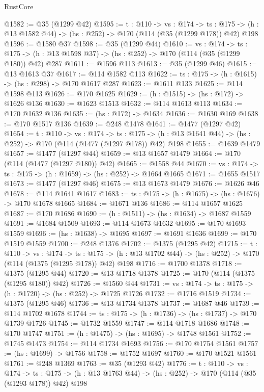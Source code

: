 \begin{lexlean}{RustCore}
\begin{coremodule}
@1582 := @35 (@1299 @42)
@1595 := {t : @110} ->
  {vs : @174} ->
  {ts : @175} -> (h : @13 @1582 @44) -> (hs : @252) -> @170 (@114 (@35 (@1299 @178)) @42) @198
@1596 := @1580 @37
@1598 := @35 (@1299 @44)
@1610 := {vs : @174} ->
  {ts : @175} -> (h : @13 @1598 @37) -> (hs : @252) -> @170 (@114 (@35 (@1299 @180)) @42) @287
@1611 := @1596 @113
@1613 := @35 (@1299 @46)
@1615 := @13 @1613 @37
@1617 := @114 @1582 @113
@1622 := {ts : @175} -> (h : @1615) -> (hs : @298) -> @170 @1617 @287
@1623 := @1611 @133
@1625 := @114 @1598 @113
@1626 := @170 @1625
@1629 := (h : @1515) -> (hs : @172) -> @1626 @136
@1630 := @1623 @1513
@1632 := @114 @1613 @113
@1634 := @170 @1632 @136
@1635 := (hs : @172) -> @1634
@1636 := @1630 @169
@1638 := @170 @1517 @136
@1639 := @248 @1478
@1641 := @1477 (@1297 @42)
@1654 := {t : @110} ->
  {vs : @174} ->
  {ts : @175} -> (h : @13 @1641 @44) -> (hs : @252) -> @170 (@114 (@1477 (@1297 @178)) @42) @198
@1655 := @1639 @1479
@1657 := @1477 (@1297 @44)
@1659 := @13 @1657 @1479
@1664 := @170 (@114 (@1477 (@1297 @180)) @42)
@1665 := @1558 @44
@1670 := {vs : @174} -> {ts : @175} -> (h : @1659) -> (hs : @252) -> @1664 @1665
@1671 := @1655 @1517
@1673 := @1477 (@1297 @46)
@1675 := @13 @1673 @1479
@1676 := @1626 @46
@1678 := @114 @1641 @1617
@1683 := {ts : @175} -> (h : @1675) -> (hs : @1676) -> @170 @1678 @1665
@1684 := @1671 @136
@1686 := @114 @1657 @1625
@1687 := @170 @1686
@1690 := (h : @1511) -> (hs : @1634) -> @1687 @1559
@1691 := @1684 @1509
@1693 := @114 @1673 @1632
@1695 := @170 @1693 @1559
@1696 := (hs : @1638) -> @1695
@1697 := @1691 @1636
@1699 := @170 @1519 @1559
@1700 := @248 @1376
@1702 := @1375 (@1295 @42)
@1715 := {t : @110} ->
  {vs : @174} ->
  {ts : @175} -> (h : @13 @1702 @44) -> (hs : @252) -> @170 (@114 (@1375 (@1295 @178)) @42) @198
@1716 := @1700 @1378
@1718 := @1375 (@1295 @44)
@1720 := @13 @1718 @1378
@1725 := @170 (@114 (@1375 (@1295 @180)) @42)
@1726 := @1560 @44
@1731 := {vs : @174} -> {ts : @175} -> (h : @1720) -> (hs : @252) -> @1725 @1726
@1732 := @1716 @1519
@1734 := @1375 (@1295 @46)
@1736 := @13 @1734 @1378
@1737 := @1687 @46
@1739 := @114 @1702 @1678
@1744 := {ts : @175} -> (h : @1736) -> (hs : @1737) -> @170 @1739 @1726
@1745 := @1732 @1559
@1747 := @114 @1718 @1686
@1748 := @170 @1747
@1751 := (h : @1475) -> (hs : @1695) -> @1748 @1561
@1752 := @1745 @1473
@1754 := @114 @1734 @1693
@1756 := @170 @1754 @1561
@1757 := (hs : @1699) -> @1756
@1758 := @1752 @1697
@1760 := @170 @1521 @1561
@1761 := @248 @1369
@1763 := @35 (@1293 @42)
@1776 := {t : @110} ->
  {vs : @174} ->
  {ts : @175} -> (h : @13 @1763 @44) -> (hs : @252) -> @170 (@114 (@35 (@1293 @178)) @42) @198

\end{coremodule}
\end{lexlean}
